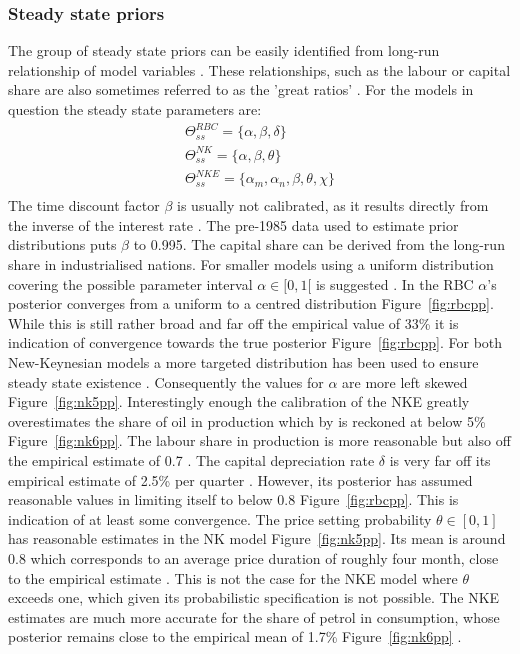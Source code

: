 \documentclass[12pt,a4paper,english]{article} %
\begin{document}
	\subsubsection{Steady state priors}
	The group of steady state priors can be easily identified from long-run relationship of model variables \cite{del_negro_forming_2008}. These relationships, such as the labour or capital share are also sometimes referred to as the 'great ratios' \cite{kydland_time_1982}. For the models in question the steady state parameters are: 
	\begin{equation}
		\begin{aligned}
			\Theta_{ss}^{RBC} = \{ \alpha, \beta, \delta \} \\
			\Theta_{ss}^{NK} = \{\alpha, \beta, \theta \} \\
			\Theta_{ss}^{NKE} = \{\alpha_m, \alpha_n, \beta, \theta, \chi \} \\
		\end{aligned}
	\end{equation}
	The time discount factor $\beta$ is usually not calibrated, as it results directly from the inverse of the interest rate \cite{guerron-quintana_bayesian_2013}. The pre-1985 data used to estimate prior distributions puts $\beta$ to 0.995.	
	The capital share can be derived from the long-run share in industrialised nations. For smaller models using a uniform distribution covering the possible parameter interval $\alpha \in [0,1[$ is suggested \cite{del_negro_forming_2008}. In the RBC $\alpha$'s posterior converges from a uniform to a centred distribution Figure~\ref{fig:rbcpp}. While this is still rather broad and far off the empirical value of 33\% it is indication of convergence towards the true posterior Figure~\ref{fig:rbcpp}.
	For both New-Keynesian models a more targeted distribution has been used to ensure steady state existence \cite{guerron-quintana_bayesian_2013}. Consequently the values for $\alpha$ are more left skewed Figure~\ref{fig:nk5pp}. Interestingly enough the calibration of the NKE greatly overestimates the share of oil in production which by \cite{blanchard_macroeconomic_2007} is reckoned at below 5\% Figure~\ref{fig:nk6pp}. The labour share in production is more reasonable but also off the empirical estimate of 0.7 \cite{blanchard_macroeconomic_2007}.
	The capital depreciation rate $\delta$ is very far off its empirical estimate of 2.5\% per quarter \cite{campbell_inspecting_1994}. However, its posterior has assumed reasonable values in limiting itself to below 0.8 Figure~\ref{fig:rbcpp}. This is indication of at least some convergence. 
	The price setting probability $\theta \in [0,1]$ has reasonable estimates in the NK model Figure~\ref{fig:nk5pp}. Its mean is around 0.8 which corresponds to an average price duration of roughly four month, close to the empirical estimate \cite{blanchard_macroeconomic_2007}. This is not the case for the NKE model where $\theta$ exceeds one, which given its probabilistic specification is not possible. The NKE estimates are much more accurate for the share of petrol in consumption, whose posterior remains close to the empirical mean of 1.7\% Figure~\ref{fig:nk6pp} \cite{blanchard_macroeconomic_2007}.
\end{document}
